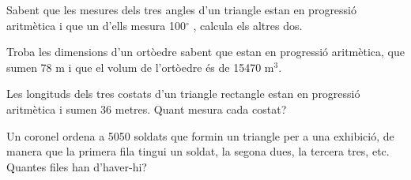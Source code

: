 \begin{activitats}
\begin{mylist}

\exer  Sabent que les mesures dels tres angles d'un triangle estan en progressió aritmètica i que un d'ells mesura 100${}^\circ$ , calcula els altres dos. 

\exer  Troba les dimensions d'un ortòedre sabent que estan en progressió aritmètica, que sumen 78 m i que el volum de l'ortòedre és de 15470 m${}^{3}$. 

\exer  Les longituds dels tres costats d'un triangle rectangle estan en progressió aritmètica i sumen 36 metres. Quant mesura cada costat? 

\exer  Un coronel ordena a 5050 soldats que formin un triangle per a una exhibició, de manera que la primera fila tingui un soldat, la segona dues, la tercera tres, etc. Quantes files han d'haver-hi? 


\end{mylist}
\end{activitats}
